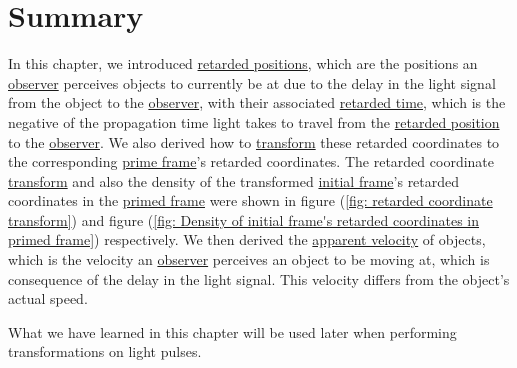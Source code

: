 
\section{Summary}\label{sect: Summary chapter 4}

In this chapter, we introduced \hyperlink{def-retarded-position}{retarded positions}, which are the positions an \hyperlink{def-observer}{observer} perceives objects to currently be at due to the delay in the light signal from the object to the \hyperlink{def-observer}{observer}, with their associated \hyperlink{def-retarded-time}{retarded time}, which is the negative of the propagation time light takes to travel from the \hyperlink{def-retarded-position}{retarded position} to the \hyperlink{def-observer}{observer}.
We also derived how to \hyperlink{def-transform}{transform} these retarded coordinates to the corresponding \hyperlink{def-Primed-Frame}{prime frame}'s retarded coordinates.
The retarded coordinate \hyperlink{def-transform}{transform} and also the density of the transformed \hyperlink{def-initial-Frame}{initial frame}'s retarded coordinates in the \hyperlink{def-Primed-Frame}{primed frame} were shown in figure (\ref{fig: retarded coordinate transform}) and figure (\ref{fig: Density of initial frame's retarded coordinates in primed frame}) respectively.
We then derived the \hyperlink{def-apparent-velocity}{apparent velocity} of objects, which is the velocity an \hyperlink{def-observer}{observer} perceives an object to be moving at, which is consequence of the delay in the light signal.
This velocity differs from the object's actual speed.

What we have learned in this chapter will be used later when performing transformations on light pulses.


%

\printbibliography[segment=\therefsegment, heading=subbibliography]

